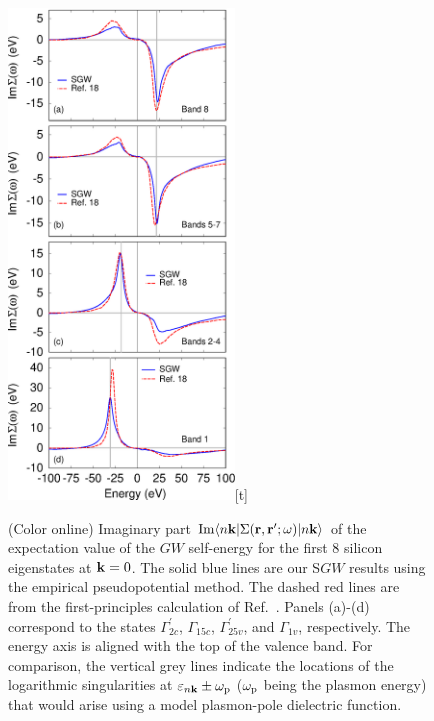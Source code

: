 \documentclass[twocolumn,prb,showpacs,superscriptaddress]{revtex4}
\def\w{\omega}
\def\E{\varepsilon}
\def\k{{\bf k}}
\def\r{{\bf r}}
\def\rp{{\bf r^\prime}}
\begin{document}
\begin  {figure}
\begin  {center}
\includegraphics[width=6cm]{fig5.eps}[t]
\end    {center}
\caption{\label{fig5}
        (Color online)
        Imaginary part ${\rm Im} \langle n\k| \Sigma(\r,\rp;\w)|n\k\rangle$ of the expectation value of the $GW$ self-energy for the first
        8 silicon eigenstates at $\k=0$. The solid blue lines are our S$GW$ results using the empirical
        pseudopotential method. The dashed red lines are from the first-principles calculation of Ref.\ .
        Panels (a)-(d) correspond to the states $\Gamma^\prime_{2c}$, $\Gamma_{15c}$, $\Gamma^\prime_{25v}$, and $\Gamma_{1v}$, respectively.
        The energy axis is aligned with the top of the valence band.
        For comparison, the vertical grey lines indicate the locations of the logarithmic singularities at $\E_{n\k}\pm\w_{\rm p}$
        ($\w_{\rm p}$ being the plasmon energy) that would arise using a model plasmon-pole dielectric function.\cite{hl}
        }
\end    {figure}
\end{document}
